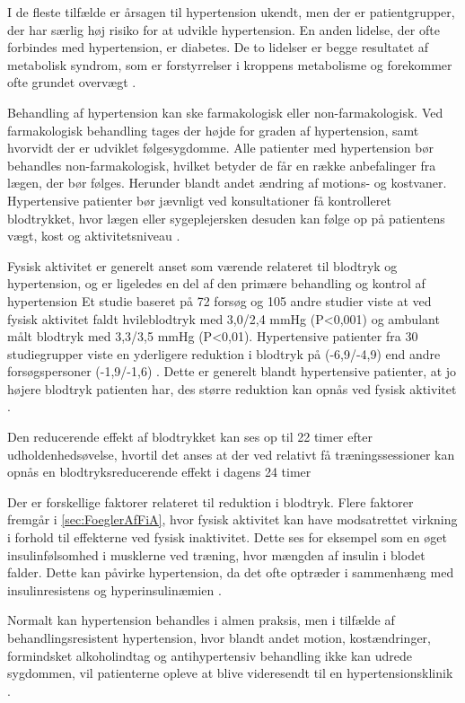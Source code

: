 I de fleste tilfælde er årsagen til hypertension ukendt, men der er patientgrupper, der har særlig høj risiko for at udvikle hypertension. En anden lidelse, der ofte forbindes med hypertension, er diabetes. De to lidelser er begge resultatet af metabolisk syndrom, som er forstyrrelser i kroppens metabolisme og forekommer ofte grundet overvægt \cite{cheung2012}.

Behandling af hypertension kan ske farmakologisk eller non-farmakologisk. Ved farmakologisk behandling tages der højde for graden af hypertension, samt hvorvidt der er udviklet følgesygdomme. Alle patienter med hypertension bør behandles non-farmakologisk, hvilket betyder de får en række anbefalinger fra lægen, der bør følges. Herunder blandt andet ændring af motions- og kostvaner. Hypertensive patienter bør jævnligt ved konsultationer få kontrolleret blodtrykket, hvor lægen eller sygeplejersken desuden kan følge op på patientens vægt, kost og aktivitetsniveau \cite{lodberg2016, bech2015}. 

Fysisk aktivitet er generelt anset som værende relateret til blodtryk og hypertension, og er ligeledes en del af den primære behandling og kontrol af hypertension \citep{pescatello2004, fagard2006}
Et studie baseret på 72 forsøg og 105 andre studier viste at ved fysisk aktivitet faldt hvileblodtryk med 3,0/2,4 mmHg (P<0,001) og ambulant målt blodtryk med 3,3/3,5 mmHg (P<0,01). 
Hypertensive patienter fra 30 studiegrupper viste en yderligere reduktion i blodtryk på (-6,9/-4,9) end andre forsøgspersoner (-1,9/-1,6) \citep{fagard2006}. 
Dette er generelt blandt hypertensive patienter, at jo højere blodtryk patienten har, des større reduktion kan opnås ved fysisk aktivitet \citep{pedersen2011, pescatello2004}.

Den reducerende effekt af blodtrykket kan ses op til 22 timer efter udholdenhedsøvelse, hvortil det anses at der ved relativt få træningssessioner kan opnås en blodtryksreducerende effekt i dagens 24 timer \citep{pescatello2004} 

Der er forskellige faktorer relateret til reduktion i blodtryk. Flere faktorer fremgår i \autoref{sec:FoeglerAfFiA}, hvor fysisk aktivitet kan have modsatrettet virkning i forhold til effekterne ved fysisk inaktivitet. Dette ses for eksempel som en øget insulinfølsomhed i musklerne ved træning, hvor mængden af insulin i blodet falder. Dette kan påvirke hypertension, da det ofte optræder i sammenhæng med insulinresistens og hyperinsulinæmien \citep{pedersen2011}.

Normalt kan hypertension behandles i almen praksis, men i tilfælde af behandlingsresistent hypertension, hvor blandt andet motion, kostændringer, formindsket alkoholindtag og antihypertensiv behandling ikke kan udrede sygdommen, vil patienterne opleve at blive videresendt til en hypertensionsklinik \cite{lodberg2016, bech2015}.

